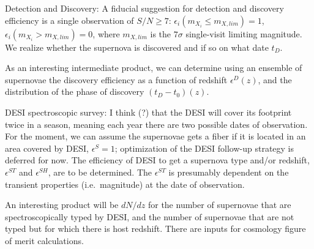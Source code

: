 \documentclass[onecolumn]{aastex61}   	%
\begin{document}
Detection and Discovery: A fiducial suggestion for detection and discovery efficiency is a single observation of $S/N \ge 7$:
 $\epsilon_i(m_{X_i} \le m_{X, lim}) = 1$,   $\epsilon_i(m_{X_i} > m_{X, lim})=0$, where $m_{X,lim}$ is the $7\sigma$ single-visit limiting
magnitude.  
We realize whether the supernova is discovered and if so on what date $t_D$.

As an interesting intermediate product, we can determine using an ensemble of supernovae the discovery efficiency as a function of redshift $\epsilon^D(z)$, and
the distribution of the phase of discovery $(t_D-t_0)(z)$.

DESI spectroscopic survey: I think (?) that the DESI will cover its footprint
twice in a season, meaning each year there are two possible dates of observation.
For the moment, we can assume
the supernovae gets a fiber if it is located in an area covered by DESI, $\epsilon^{S}=1$; optimization of the DESI follow-up strategy is deferred
for now. 
The efficiency of DESI to get a supernova type and/or redshift, $\epsilon^{ST}$ and  $\epsilon^{SH}$, are to be
determined.  The  $\epsilon^{ST}$ is presumably dependent on the transient properties (i.e.\ magnitude) at the
date of observation.

An interesting product will be $dN/dz$ for the number of supernovae that are spectroscopically typed by DESI, and the
number of supernovae that are not typed but for which there is host redshift.  There are inputs for cosmology figure of merit calculations.
\end{document}
